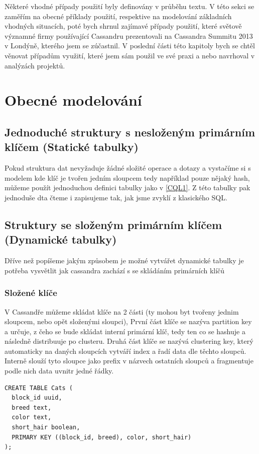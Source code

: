 Některé vhodné případy použití byly definovány v průběhu textu. V této sekci se zaměřím na obecné příklady použití, respektive na modelování základních vhodných situacích, poté bych shrnul zajímavé případy použití, které světově významné firmy používající Cassandru prezentovali na Cassandra Summitu 2013 v Londýně, kterého jsem se zúčastnil. V poslední části této kapitoly bych se chtěl věnovat případům využití, které jsem sám použil ve své praxi a nebo navrhoval v analýzách projektů. 

\section{Obecné modelování}

\subsection{Jednoduché struktury s nesloženým primárním klíčem (Statické tabulky)}

Pokud struktura dat nevyžaduje žádné složité operace a dotazy a vystačíme si s modelem kde klíč je tvořen jedním sloupcem tedy například pouze nějaký hash, můžeme použít jednoduchou definici tabulky jako v \ref{CQL1}. Z této tabulky pak jednoduše dta čteme i zapisujeme tak, jak jsme zvyklí z klasického SQL.

\subsection{Struktury se složeným primárním klíčem (Dynamické tabulky)}

Dříve než popíšeme jakým způsobem je možné vytvářet dynamické tabulky je potřeba vysvětlit jak cassandra zachází s se skládáním primárních klíčů

\subsubsection*{Složené klíče}
V Cassandře můžeme skládat klíče na 2 části (ty mohou byt tvořeny jednim sloupcem, nebo opět složenými sloupci), První část klíče se nazýva partition key a určuje, z čeho se bude skládat interní primární klíč, tedy ten co se hashuje a následně distribuuje po clusteru. Druhá část klíče se nazývá clustering key, který automaticky na daných sloupcích vytváří index a řadí data dle těchto sloupců. Interně slouží tyto sloupce jako prefix v názvech ostatních sloupců a fragmentuje podle nich data uvnitr jedné řádky. 

\begin{lstlisting}[caption={Ukázka složených klíčů},label=CQL2]
CREATE TABLE Cats (
  block_id uuid,
  breed text,
  color text,
  short_hair boolean,
  PRIMARY KEY ((block_id, breed), color, short_hair)
);
\end{lstlisting}

